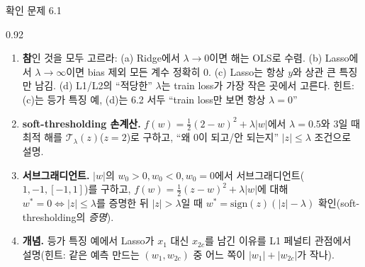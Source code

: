 \begin{frame}{확인 문제 6.1}
\begin{center}\begin{varwidth}{0.92\textwidth}
  \small
  \begin{enumerate}
    \item \textbf{참}인 것을 모두 고르라: (a) Ridge에서 $\lambda\to0$이면 해는
      OLS로 수렴. (b) Lasso에서 $\lambda\to\infty$이면 bias 제외 모든 계수
      정확히 0. (c) Lasso는 항상 $y$와 상관 큰 특징만 남김.
      (d) L1/L2의 ``적당한'' $\lambda$는 train loss가 가장 작은 곳에서 고른다.
      \newline\newline
      {\footnotesize 힌트: (c)는 등가 특징 예, (d)는 6.2 서두 ``train loss만
      보면 항상 $\lambda=0$''}
    \item \textbf{soft-thresholding 손계산.} $f(w)=\frac12(2-w)^2+\lambda|w|$에서
      $\lambda=0.5$와 3일 때 최적 해를 $\mathcal{T}_\lambda(z)$($z=2$)로 구하고,
      ``왜 0이 되고/안 되는지'' $|z|\le\lambda$ 조건으로 설명.
    \item \textbf{서브그래디언트.} $|w|$의 $w_0>0, w_0<0, w_0=0$에서
      서브그래디언트($1, -1, [-1,1]$)를 구하고, $f(w)=\frac12(z-w)^2+\lambda|w|$에
      대해 $w^{*}=0 \iff |z|\le\lambda$를 증명한 뒤 $|z|>\lambda$일 때
      $w^{*}=\text{sign}(z)(|z|-\lambda)$ 확인(soft-thresholding의 \emph{증명}).
    \item \textbf{개념.} 등가 특징 예에서 Lasso가 $x_1$ 대신 $x_{2c}$를
      남긴 이유를 L1 페널티 관점에서 설명(힌트: 같은 예측 만드는
      $(w_1,w_{2c})$ 중 어느 쪽이 $|w_1|+|w_{2c}|$가 작나).
  \end{enumerate}
\end{varwidth}\end{center}
\end{frame}
